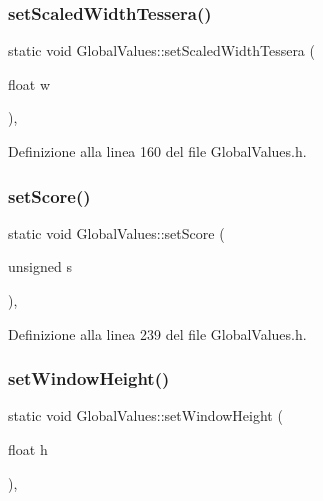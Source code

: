 \subsubsection{\texorpdfstring{set\+Scaled\+Width\+Tessera()}{setScaledWidthTessera()}}
{\footnotesize\ttfamily static void Global\+Values\+::set\+Scaled\+Width\+Tessera (\begin{DoxyParamCaption}\item[{float}]{w }\end{DoxyParamCaption})\hspace{0.3cm}{\ttfamily [inline]}, {\ttfamily [static]}}



Definizione alla linea 160 del file Global\+Values.\+h.

\mbox{\label{class_global_values_a11410069107ba5cbd3bd96d549e6d630}} 
\subsubsection{\texorpdfstring{set\+Score()}{setScore()}}
{\footnotesize\ttfamily static void Global\+Values\+::set\+Score (\begin{DoxyParamCaption}\item[{unsigned}]{s }\end{DoxyParamCaption})\hspace{0.3cm}{\ttfamily [inline]}, {\ttfamily [static]}}



Definizione alla linea 239 del file Global\+Values.\+h.

\mbox{\label{class_global_values_aace63d43ed8917e3c96a90b9d703a474}} 
\subsubsection{\texorpdfstring{set\+Window\+Height()}{setWindowHeight()}}
{\footnotesize\ttfamily static void Global\+Values\+::set\+Window\+Height (\begin{DoxyParamCaption}\item[{float}]{h }\end{DoxyParamCaption})\hspace{0.3cm}{\ttfamily [inline]}, {\ttfamily [static]}}



